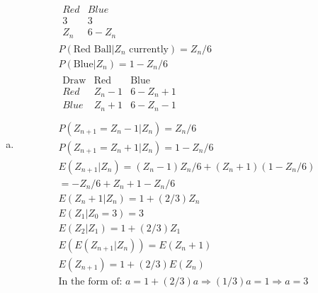 \documentclass{article}
\newcommand{\ra}{\Rightarrow}
\begin{document}
\begin{flushleft}
\begin{enumerate}[(a)]
\item 
\begin{multline*}\\
\begin{array}{c|c}
Red & Blue\\
\hline
3 & 3\\
Z_n & 6-Z_n
\end{array}\\
P(\text{Red Ball}|Z_n \text{ currently})=Z_n/6\\
P(\text{Blue}|Z_n)=1-Z_n/6\\
\begin{array}{c|c|c}
\text{Draw} & \text{Red} & \text{Blue}\\
\hline
Red & Z_n-1&6-Z_n+1\\
Blue &Z_n+1&6-Z_n-1\\
\end{array}\\
P(Z_{n+1}=Z_n-1|Z_n)=Z_n/6\\
P(Z_{n+1}=Z_n+1|Z_n)=1-Z_n/6\\
E(Z_{n+1}|Z_n)=(Z_n-1)Z_n/6+(Z_n+1)(1-Z_n/6)\\
=-Z_n/6+Z_n+1-Z_n/6\\
E(Z_n+1|Z_n)=1+(2/3)Z_n\\
E(Z_1|Z_0=3)=3\\
E(Z_2|Z_1)=1+(2/3)Z_1\\
E(E(Z_{n+1}|Z_n))=E(Z_n+1)\\
E(Z_{n+1})=1+(2/3)E(Z_n)\\
\text{In the form of: } a=1+(2/3)a \ra (1/3)a=1\ra a=3\\
\end{multline*}

\end{enumerate}


\end{flushleft}
\end{document}
